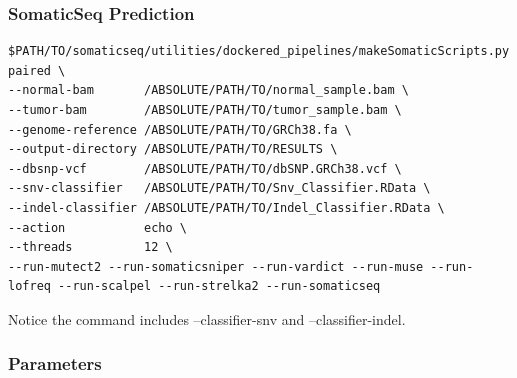\documentclass[10pt,letterpaper]{article}
\begin{document}
\begin{sloppypar}
\subsubsection{SomaticSeq Prediction}

\begin{lstlisting}
$PATH/TO/somaticseq/utilities/dockered_pipelines/makeSomaticScripts.py paired \
--normal-bam       /ABSOLUTE/PATH/TO/normal_sample.bam \
--tumor-bam        /ABSOLUTE/PATH/TO/tumor_sample.bam \
--genome-reference /ABSOLUTE/PATH/TO/GRCh38.fa \
--output-directory /ABSOLUTE/PATH/TO/RESULTS \
--dbsnp-vcf        /ABSOLUTE/PATH/TO/dbSNP.GRCh38.vcf \
--snv-classifier   /ABSOLUTE/PATH/TO/Snv_Classifier.RData \
--indel-classifier /ABSOLUTE/PATH/TO/Indel_Classifier.RData \
--action           echo \
--threads          12 \
--run-mutect2 --run-somaticsniper --run-vardict --run-muse --run-lofreq --run-scalpel --run-strelka2 --run-somaticseq
\end{lstlisting}

Notice the command includes --classifier-snv and --classifier-indel.





\subsubsection{Parameters}


\end{sloppypar}
\end{document}
